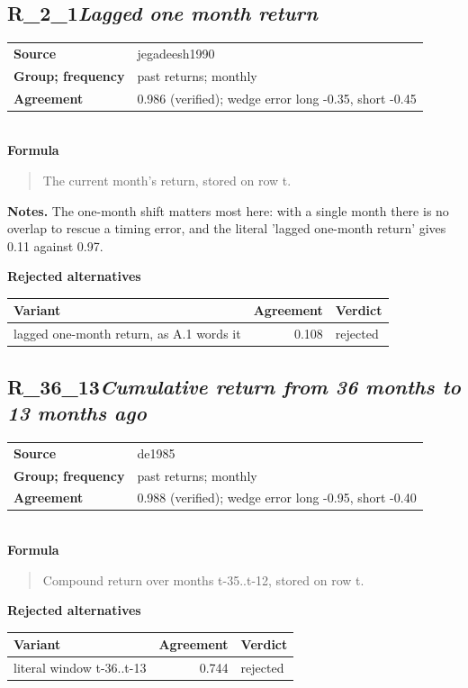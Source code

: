 \documentclass[11pt]{article}
\begin{document}
\subsection*{R\_2\_1\quad\normalfont\itshape Lagged one month return}
\begin{tabular}{@{}p{3.3cm}p{12.3cm}@{}}
\textbf{Source} & jegadeesh1990\\
\textbf{Group; frequency} & past returns; monthly\\
\textbf{Agreement} & 0.986 (verified); wedge error long -0.35, short -0.45\\
\end{tabular}\\[4pt]
\textbf{Formula}
\begin{quote}\small
The current month's return, stored on row t.\\

\end{quote}
\textbf{Notes.} The one-month shift matters most here: with a single month there is no overlap
to rescue a timing error, and the literal 'lagged one-month return' gives 0.11
against 0.97.

\textbf{Rejected alternatives}\\[2pt]
{\small\begin{longtable}{@{}p{9.6cm}rp{4.3cm}@{}}
\toprule Variant & Agreement & Verdict\\\midrule\endhead
lagged one-month return, as A.1 words it & 0.108 & rejected\\
\bottomrule\end{longtable}}
\subsection*{R\_36\_13\quad\normalfont\itshape Cumulative return from 36 months to 13 months ago}
\begin{tabular}{@{}p{3.3cm}p{12.3cm}@{}}
\textbf{Source} & de1985\\
\textbf{Group; frequency} & past returns; monthly\\
\textbf{Agreement} & 0.988 (verified); wedge error long -0.95, short -0.40\\
\end{tabular}\\[4pt]
\textbf{Formula}
\begin{quote}\small
Compound return over months t-35..t-12, stored on row t.\\

\end{quote}
\textbf{Rejected alternatives}\\[2pt]
{\small\begin{longtable}{@{}p{9.6cm}rp{4.3cm}@{}}
\toprule Variant & Agreement & Verdict\\\midrule\endhead
literal window t-36..t-13 & 0.744 & rejected\\
\bottomrule\end{longtable}}
\end{document}
